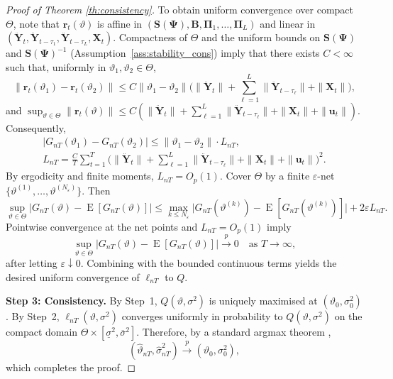 \documentclass[12pt]{article}
\theoremstyle{plain}
\theoremstyle{definition}
\newcommand{\xvec}{\boldsymbol}
\newcommand{\xmat}{\mathbf}
\DeclareMathOperator{\E}{E}
\begin{document}
\begin{proof}[Proof of Theorem \ref{th:consistency}]
To obtain uniform convergence over compact $\Theta$, note that $\xvec{r}_t(\vartheta)$ is affine in \linebreak
$(\xmat{S}(\xmat{\Psi}),\xmat{B},\xmat{\Pi}_1,\dots,\xmat{\Pi}_L)$ and linear in $(\ddot{\xvec{Y}}_t,\ddot{\xvec{Y}}_{t-\tau_1}, \ddot{\xvec{Y}}_{t-\tau_L},\xmat{X}_t)$.
Compactness of $\Theta$ and the uniform bounds on $\xmat{S}(\xmat{\Psi})$ and $\xmat{S}(\xmat{\Psi})^{-1}$
(Assumption~\ref{ass:stability_cons}) imply that there exists $C<\infty$ such that, uniformly in $\vartheta_1,\vartheta_2\in\Theta$,
\[
\|\xvec{r}_t(\vartheta_1)-\xvec{r}_t(\vartheta_2)\|
\le
C\|\vartheta_1-\vartheta_2\|\big(\|\ddot{\xvec{Y}}_t\|+ \sum_{\ell=1}^{L}\|\ddot{\xvec{Y}}_{t-\tau_\ell}\| +\|\xmat{X}_t\|\big),
\]
and $\sup_{\vartheta\in\Theta}\|\xvec{r}_t(\vartheta)\|\le C(\|\ddot{\xvec{Y}}_t\|+ \sum_{\ell=1}^{L}\|\ddot{\xvec{Y}}_{t-\tau_\ell}\| +\|\xmat{X}_t\|+\|\xvec{u}_t\|)$.
Consequently,
\begin{eqnarray*}
|G_{nT}(\vartheta_1)-G_{nT}(\vartheta_2)| 
\le
\|\vartheta_1-\vartheta_2\|\cdot L_{nT},
\\
L_{nT} =\frac{C}{T}\sum_{t=1}^T\big(\|\ddot{\xvec{Y}}_t\|+ \sum_{\ell=1}^{L}\|\ddot{\xvec{Y}}_{t-\tau_\ell}\| +\|\xmat{X}_t\|+\|\xvec{u}_t\|\big)^2. 
\end{eqnarray*}
By ergodicity and finite moments, $L_{nT}=O_p(1)$.
Cover $\Theta$ by a finite $\varepsilon$-net $\{\vartheta^{(1)},\ldots,\vartheta^{(N_\varepsilon)}\}$.
Then
\[
\sup_{\vartheta\in\Theta}\big|G_{nT}(\vartheta)-\E[G_{nT}(\vartheta)]\big|
\le
\max_{k\le N_\varepsilon}\big|G_{nT}(\vartheta^{(k)})-\E[G_{nT}(\vartheta^{(k)})]\big|
+2\varepsilon L_{nT}.
\]
Pointwise convergence at the net points and $L_{nT}=O_p(1)$ imply
\[
\sup_{\vartheta\in\Theta}\big|G_{nT}(\vartheta)-\E[G_{nT}(\vartheta)]\big|\xrightarrow{p}0
\quad\text{as }T\to\infty,
\]
after letting $\varepsilon\downarrow 0$.
Combining with the bounded continuous terms yields the desired uniform convergence of $\ell_{nT}$ to $Q$.

\medskip
\noindent\textbf{Step 3: Consistency.}
By Step~1, $Q(\vartheta,\sigma^2)$ is uniquely maximised at $(\vartheta_0,\sigma_0^2)$.
By Step~2, $\ell_{nT}(\vartheta,\sigma^2)$ converges uniformly in probability to $Q(\vartheta,\sigma^2)$ on the compact
domain $\Theta\times[\underline\sigma^2,\overline\sigma^2]$.
Therefore, by a standard argmax theorem \citep[Theorem 2.1]{newey1994large},
\[
(\hat\vartheta_{nT},\hat\sigma^2_{nT})\xrightarrow{p}(\vartheta_0,\sigma_0^2),
\]
which completes the proof.
\end{proof}
\end{document}
